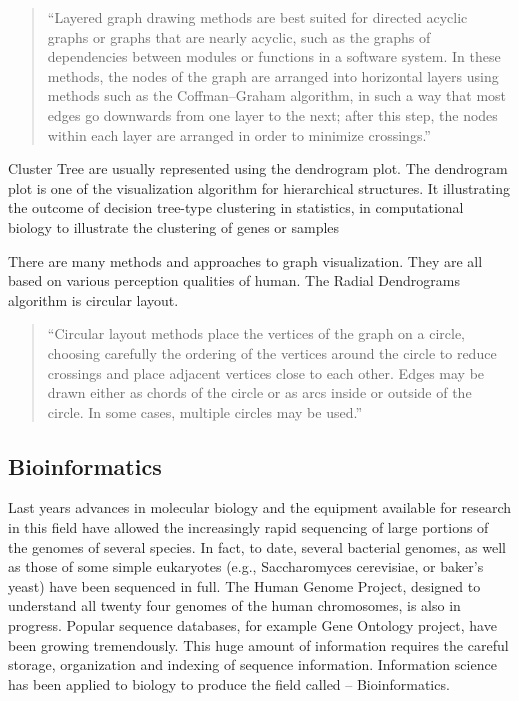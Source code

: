 \begin{quotation}
``Layered graph drawing methods are best suited for directed acyclic graphs or graphs that are nearly acyclic, such as the graphs of dependencies between modules or functions in a software system. In these methods, the nodes of the graph are arranged into horizontal layers using methods such as the Coffman–Graham algorithm, in such a way that most edges go downwards from one layer to the next; after this step, the nodes within each layer are arranged in order to minimize crossings.''~\cite{Layered_graph_drawing}
\end{quotation}


Cluster Tree are usually represented using the dendrogram plot. The dendrogram plot is one of the visualization algorithm for hierarchical structures. It illustrating the outcome of decision tree-type clustering in statistics, in computational biology to illustrate the clustering of genes or samples~\cite{Dendrogram}

There are many methods and approaches to graph visualization. They are all based on various perception qualities of human.
The Radial Dendrograms~\cite{Radial_dendrogram} algorithm is circular layout.

\begin{quotation}
``Circular layout methods place the vertices of the graph on a circle, choosing carefully the ordering of the vertices around the circle to reduce crossings and place adjacent vertices close to each other. Edges may be drawn either as chords of the circle or as arcs inside or outside of the circle. In some cases, multiple circles may be used.''~\cite{Circular_layout}
\end{quotation}



\subsection{Bioinformatics}
\label{sec:bioinformatics}

Last years advances in molecular biology and the equipment available for research in this field have allowed the increasingly rapid sequencing of large portions of the genomes of several species.
In fact, to date, several bacterial genomes, as well as those of some simple eukaryotes (e.g., Saccharomyces cerevisiae, or baker's yeast) have been sequenced in full.
The Human Genome Project, designed to understand all twenty four genomes of the human chromosomes, is also in progress. Popular sequence databases, for example Gene Ontology project, have been growing tremendously.
This huge amount of information requires the careful storage, organization and indexing of sequence information. Information science has been applied to biology to produce the field called -- Bioinformatics.


